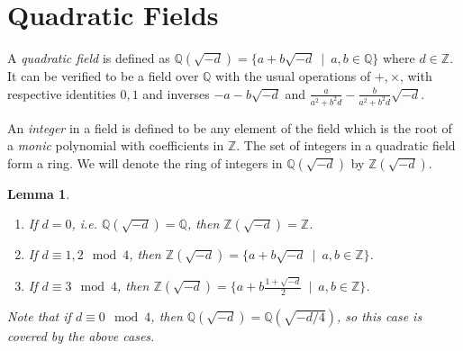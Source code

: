 \documentclass[12pt]{article}
\newcommand{\ints}{{\mathbb{Z}}}
\newcommand{\qf}{{\mathbb{Q}}}
\newtheorem{lemma}[thm]{Lemma}
\begin{document}
\section{Quadratic Fields}

A {\em quadratic field} is defined as $\qf(\sqrt{-d}) = \{a + b\sqrt{-d}\ \mid\ a, b \in \qf\}$ where $d \in \ints$. It can be verified to be a field over $\qf$ with the usual operations of $+, \times$, with respective identities $0, 1$ and inverses $- a - b\sqrt{-d}$ and $\frac{a}{a^2 + b^2 d} - \frac{b}{a^2 + b^2 d}\sqrt{-d}$.

An {\em integer} in a field is defined to be any element of the field which is the root of a {\em monic} polynomial with coefficients in $\ints$.  
The set of integers in a quadratic field form a ring.  We will denote the ring of integers in $\qf(\sqrt{-d})$ by $\ints(\sqrt{-d})$. 
\begin{lemma}
\begin{enumerate}
\item If $d = 0$, i.e. $\qf(\sqrt{-d}) = \qf$, then $\ints(\sqrt{-d}) = \ints$.
\item If $d \equiv 1, 2 \mod 4$, then $\ints(\sqrt{-d}) = \{a + b\sqrt{-d}\ \mid\ a, b \in \ints\}$.
\item If $d \equiv 3 \mod 4$, then $\ints(\sqrt{-d}) = \{a + b\frac{1 + \sqrt{-d}}{2}\ \mid\  a, b \in \ints\}$.
\end{enumerate}
Note that if $d \equiv 0 \mod 4$, then $\qf(\sqrt{-d}) = \qf(\sqrt{-d/4})$, so this case is covered by the above cases.
\end{lemma}
\end{document}
